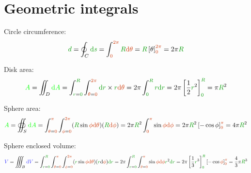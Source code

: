 \section{Geometric integrals}

Circle circumference:
\[
\dist{d}
= \oint_C \dist{\d s}
= \int_{\angle{0}}^{\angle{2\pi}} \dist{R} \angle{\d \theta}
= \dist{R} \left[ \theta \right]_{\angle{0}}^{\angle{2\pi}}
= 2\pi \dist{R}
\]

Disk area:
\[
\area{A}
= \iint_D \area{\d A}
= \int_{\dist{r}=\dist{0}}^{\dist{R}}
  \int_{\angle{\theta}=\angle{0}}^{\angle{2\pi}}
  \dist{\d r} \times \dist{r} \angle{\d \theta}
= 2\pi \int_{\dist{0}}^{\dist{R}} \dist{r} \dist{\d r}
= 2\pi \left[\frac 1 2 \dist{r}^2\right]_{\dist{0}}^{\dist{R}}
= \pi \dist{R}^2
\]

Sphere area:
\[
\area{A}
= \oiint_S \area{\d A}
= \int_{\angle{\theta}=\angle{0}}^{\angle{\pi}}
  \int_{\angle{\phi}=\angle{0}}^{\angle{2\pi}}
  (\dist{R} \sin \angle{\phi} \angle{\d \theta})
  (\dist{R} \angle{\d \phi})
= 2\pi \dist{R}^2 \int_{\angle{0}}^{\angle{\pi}} \sin \angle{\phi} \angle{\d \phi}
= 2\pi \dist{R}^2 \left[ - \cos \phi \right]_{\angle{0}}^{\angle{\pi}}
= 4\pi \dist{R}^2
\]

Sphere enclosed volume:
\[
\vol{V}
= \iiint_B \vol{\d V}
= \int_{\dist{r}=\dist{0}}^{\dist{R}}
  \int_{\angle{\theta}=\angle{0}}^{\angle{\pi}}
  \int_{\angle{\phi}=\angle{0}}^{\angle{2\pi}}
  (\dist{r} \sin \angle{\phi} \angle{\d \theta}) (\dist{r} \d \angle{\phi}) \dist{\d r}
= 2 \pi
  \int_{\dist{r}=\dist{0}}^{\dist{R}}
  \int_{\angle{\theta}=\angle{0}}^{\angle{\pi}} \sin \angle{\phi} \angle{\d \phi} \dist{r}^2 \dist{\d r}
= 2 \pi
  \left[\frac 1 3 \dist{r}^3\right]_{\dist{0}}^{\dist{R}}
  \left[- \cos \angle{\phi}\right]_{\angle{0}}^{\angle{\pi}}
= \frac 4 3 \pi \dist{R}^3
\]
